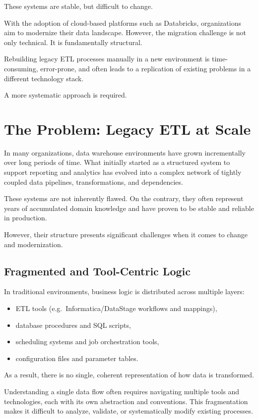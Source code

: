 \documentclass[11pt,a4paper]{article}
\begin{document}
These systems are stable, but difficult to change.

With the adoption of cloud-based platforms such as Databricks, organizations aim to modernize their data landscape. However, the migration challenge is not only technical. It is fundamentally structural.

Rebuilding legacy ETL processes manually in a new environment is time-consuming, error-prone, and often leads to a replication of existing problems in a different technology stack.

A more systematic approach is required.

\section{The Problem: Legacy ETL at Scale}

In many organizations, data warehouse environments have grown incrementally over long periods of time. What initially started as a structured system to support reporting and analytics has evolved into a complex network of tightly coupled data pipelines, transformations, and dependencies.

These systems are not inherently flawed. On the contrary, they often represent years of accumulated domain knowledge and have proven to be stable and reliable in production.

However, their structure presents significant challenges when it comes to change and modernization.

\subsection{Fragmented and Tool-Centric Logic}

In traditional environments, business logic is distributed across multiple layers:
\begin{itemize}
  \item ETL tools (e.g.\ Informatica/DataStage workflows and mappings),
  \item database procedures and SQL scripts,
  \item scheduling systems and job orchestration tools,
  \item configuration files and parameter tables.
\end{itemize}

As a result, there is no single, coherent representation of how data is transformed.

Understanding a single data flow often requires navigating multiple tools and technologies, each with its own abstraction and conventions. This fragmentation makes it difficult to analyze, validate, or systematically modify existing processes.
\end{document}
